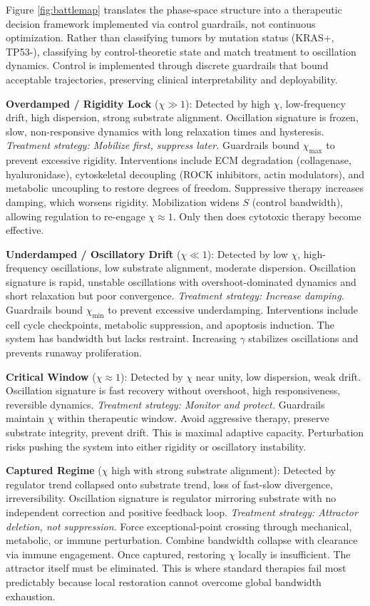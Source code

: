 \documentclass[11pt,letterpaper]{article}
\begin{document}
Figure \ref{fig:battlemap} translates the phase-space structure into a therapeutic decision framework implemented via control guardrails, not continuous optimization. Rather than classifying tumors by mutation status (KRAS+, TP53-), classifying by control-theoretic state and match treatment to oscillation dynamics. Control is implemented through discrete guardrails that bound acceptable trajectories, preserving clinical interpretability and deployability.

\textbf{Overdamped / Rigidity Lock} ($\chi \gg 1$): Detected by high $\chi$, low-frequency drift, high dispersion, strong substrate alignment. Oscillation signature is frozen, slow, non-responsive dynamics with long relaxation times and hysteresis. \textit{Treatment strategy: Mobilize first, suppress later.} Guardrails bound $\chi_{\text{max}}$ to prevent excessive rigidity. Interventions include ECM degradation (collagenase, hyaluronidase), cytoskeletal decoupling (ROCK inhibitors, actin modulators), and metabolic uncoupling to restore degrees of freedom. Suppressive therapy increases damping, which worsens rigidity. Mobilization widens $S$ (control bandwidth), allowing regulation to re-engage $\chi \approx 1$. Only then does cytotoxic therapy become effective.

\textbf{Underdamped / Oscillatory Drift} ($\chi \ll 1$): Detected by low $\chi$, high-frequency oscillations, low substrate alignment, moderate dispersion. Oscillation signature is rapid, unstable oscillations with overshoot-dominated dynamics and short relaxation but poor convergence. \textit{Treatment strategy: Increase damping.} Guardrails bound $\chi_{\text{min}}$ to prevent excessive underdamping. Interventions include cell cycle checkpoints, metabolic suppression, and apoptosis induction. The system has bandwidth but lacks restraint. Increasing $\gamma$ stabilizes oscillations and prevents runaway proliferation.

\textbf{Critical Window} ($\chi \approx 1$): Detected by $\chi$ near unity, low dispersion, weak drift. Oscillation signature is fast recovery without overshoot, high responsiveness, reversible dynamics. \textit{Treatment strategy: Monitor and protect.} Guardrails maintain $\chi$ within therapeutic window. Avoid aggressive therapy, preserve substrate integrity, prevent drift. This is maximal adaptive capacity. Perturbation risks pushing the system into either rigidity or oscillatory instability.

\textbf{Captured Regime} ($\chi$ high with strong substrate alignment): Detected by regulator trend collapsed onto substrate trend, loss of fast-slow divergence, irreversibility. Oscillation signature is regulator mirroring substrate with no independent correction and positive feedback loop. \textit{Treatment strategy: Attractor deletion, not suppression.} Force exceptional-point crossing through mechanical, metabolic, or immune perturbation. Combine bandwidth collapse with clearance via immune engagement. Once captured, restoring $\chi$ locally is insufficient. The attractor itself must be eliminated. This is where standard therapies fail most predictably because local restoration cannot overcome global bandwidth exhaustion.
\end{document}
